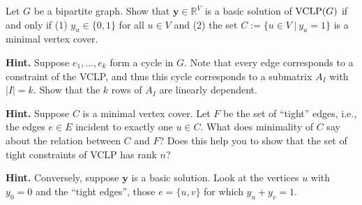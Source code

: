\documentclass[11pt,a4paper,oneside]{article}
\newcommand{\R}{\mathbb{R}}
\newcommand{\y}{\mathbf{y}}
\begin{document}
\begin{problem}{4}
	\statement
     Let $G$ be a bipartite graph.
    Show that $\y \in \R^{V}$ is a basic solution of ${\rm VCLP}(G)$ if and only if 
    (1) $y_u \in \{0,1\}$ for all $u \in V$ and (2) the set $C := \{u \in V \ | \ y_u = 1\}$ is a 
    minimal vertex cover.
    
    \solution
    
\end{problem}

\textbf{Hint.} Suppose $e_1,\dots,e_k$ form a cycle in $G$. Note that every edge corresponds
to a constraint of the VCLP, and thus this cycle corresponds to a submatrix $A_I$ with
$|I|= k$. Show that the $k$ rows of $A_I$ are linearly dependent. 

\textbf{Hint.} Suppose $C$ is a minimal vertex cover. Let $F$ be the set of ``tight'' edges, i.e., 
the edges $e \in E$ incident to exactly one $u \in C$. What does minimality of $C$ say 
about the relation between $C$ and $F$? Does this help you to show that the set
of tight constraints of VCLP has rank $n$?

\textbf{Hint.} Conversely, suppose $\y$ is a basic solution. Look at the vertices
$u$ with $y_0 = 0$ and the ``tight edges'', those $e = \{u,v\}$ for which $y_u + y_v = 1$.
\end{document}
